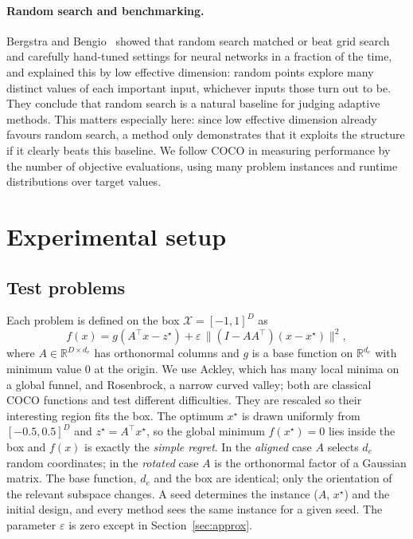 \documentclass[12pt]{article}
\begin{document}
\paragraph{Random search and benchmarking.} Bergstra and Bengio~\cite{bergstra2012random} showed that random search
matched or beat grid search and carefully hand-tuned settings for neural networks in a fraction of the
time, and explained this by low effective dimension: random points explore many distinct values of
each important input, whichever inputs those turn out to be. They conclude that random search is a
natural baseline for judging adaptive methods. This matters especially here: since low effective
dimension already favours random search, a method only demonstrates that it exploits the structure
if it clearly beats this baseline. We follow COCO \cite{hansen2021coco} in measuring performance by
the number of objective evaluations, using many problem instances and runtime distributions over
target values.

\section{Experimental setup}
\subsection{Test problems}
Each problem is defined on the box $\mathcal{X}=[-1,1]^D$ as
\begin{equation}
  f(x) = g\!\left(A^\top x - z^\star\right) + \varepsilon\,\big\|(I - AA^\top)(x - x^\star)\big\|^2,
  \label{eq:problem}
\end{equation}
where $A\in\mathbb{R}^{D\times d_e}$ has orthonormal columns and $g$ is a base function on
$\mathbb{R}^{d_e}$ with minimum value $0$ at the origin. We use Ackley, which has many local minima on
a global funnel, and Rosenbrock, a narrow curved valley; both are classical COCO functions and test
different difficulties. They are rescaled so their interesting region fits the box. The optimum
$x^\star$ is drawn uniformly from $[-0.5,0.5]^D$ and $z^\star = A^\top x^\star$, so the global minimum
$f(x^\star)=0$ lies inside the box and $f(x)$ is exactly the \emph{simple regret}. In the
\emph{aligned} case $A$ selects $d_e$ random coordinates; in the \emph{rotated} case $A$ is the
orthonormal factor of a Gaussian matrix. The base function, $d_e$ and the box are identical; only the
orientation of the relevant subspace changes. A seed determines the instance ($A$, $x^\star$) and
the initial design, and every method sees the same instance for a given seed. The parameter
$\varepsilon$ is zero except in Section~\ref{sec:approx}.
\end{document}
